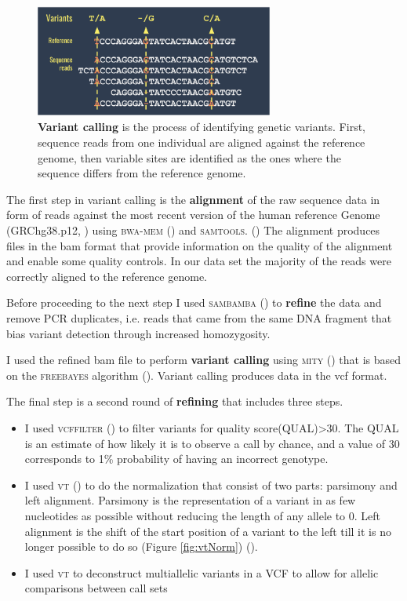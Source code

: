 \begin{figure}[H]
\centering
\includegraphics[width=0.7\textwidth]{Fig/variantCalling.png}
\decoRule
\caption{\textbf{Variant calling} is the process of identifying genetic variants. First, sequence reads from one individual are aligned against the reference genome, then variable sites are identified as the ones where the sequence differs from the reference genome.} 
\label{fig:variantCalling}
\end{figure}



The first step in variant calling is the \textbf{alignment} of the raw sequence data in form of reads against the most recent version of the human reference Genome (GRChg38.p12, \cite{rosenbloom2015ucsc}) using \textsc{bwa-mem} (\cite{li2013aligning}) and \textsc{samtools}. (\cite{li2009sequence}) The alignment produces files in the bam format that provide information on the quality of the alignment and enable some quality controls.  In our data set the majority of the reads were correctly aligned to the reference genome. 

Before proceeding to the next step I used \textsc{sambamba} (\cite{tarasov2015sambamba}) to \textbf{refine} the data and remove PCR duplicates, i.e. reads that came from the same DNA fragment that bias variant detection through increased homozygosity.\newline

I used the refined bam file to perform \textbf{variant calling} using \textsc{mity} (\cite{puttick2019mity}) that is based on the \textsc{freebayes} algorithm (\cite{garrison2012haplotype}). Variant calling produces data in the vcf format. 

The final step is a second round of \textbf{refining} that includes three steps. 
\begin{itemize}
    \item I used \textsc{vcffilter} (\cite{vcflib}) to filter variants for \gls{quality score}(QUAL)>30. The QUAL is an estimate of how likely it is to observe a call by chance, and a value of 30 corresponds to 1\% probability of having an incorrect genotype.
    \item I used \textsc{vt} (\cite{tan2015unified}) to do the normalization that consist of two parts: parsimony and left alignment. Parsimony is the representation of a variant in as few nucleotides as possible without reducing the length of any allele to 0. Left alignment is the shift of the start position of a variant to the left till it is no longer possible to do so (Figure \ref{fig:vtNorm}) (\cite{tan2015unified}).
    \item I used \textsc{vt} to deconstruct multiallelic variants in a VCF to allow for allelic comparisons between call sets
\end{itemize}

